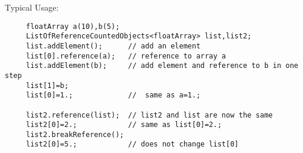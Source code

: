 Typical Usage:
\begin{verbatim}
     floatArray a(10),b(5);
     ListOfReferenceCountedObjects<floatArray> list,list2;
     list.addElement();      // add an element
     list[0].reference(a);   // reference to array a
     list.addElement(b);     // add element and reference to b in one step
     list[1]=b;
     list[0]=1.;             //  same as a=1.;

     list2.reference(list);  // list2 and list are now the same
     list2[0]=2.;            // same as list[0]=2.;
     list2.breakReference();
     list2[0]=5.;            // does not change list[0]
\end{verbatim}

